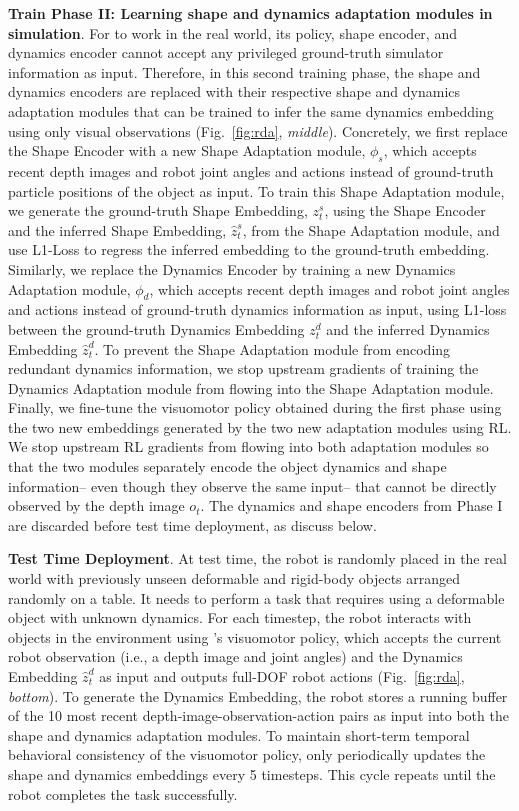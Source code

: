 \textbf{Train Phase II: Learning shape and dynamics adaptation modules in simulation}.
For \methodname{} to work in the real world, its policy, shape encoder, and dynamics encoder cannot accept any privileged ground-truth simulator information as input. Therefore, in this second training phase, the shape and dynamics encoders are replaced with their respective shape and dynamics adaptation modules that can be trained to infer the same dynamics embedding using only visual observations (Fig.~\ref{fig:rda}, \textit{middle}). Concretely, we first replace the Shape Encoder with a new Shape Adaptation module, $\phi_{s}$, which accepts recent depth images and robot joint angles and actions instead of ground-truth particle positions of the object as input. To train this Shape Adaptation module, we generate the ground-truth Shape Embedding, $z_t^{s}$, using the Shape Encoder and the inferred Shape Embedding, $\hat{z}_t^{s}$, from the Shape Adaptation module, and use L1-Loss to regress the inferred embedding to the ground-truth embedding. 
Similarly, we replace the Dynamics Encoder by training a new Dynamics Adaptation module, $\phi_{d}$, which accepts recent depth images and robot joint angles and actions instead of ground-truth dynamics information as input, using L1-loss between the ground-truth Dynamics Embedding $z_t^{d}$ and the inferred Dynamics Embedding $\hat{z}_t^{d}$. To prevent the Shape Adaptation module from encoding redundant dynamics information, we stop upstream gradients of training the Dynamics Adaptation module from flowing into the Shape Adaptation module. Finally, we fine-tune the visuomotor policy obtained during the first phase using the two new embeddings generated by the two new adaptation modules using RL. We stop upstream RL gradients from flowing into both adaptation modules so that the two modules separately encode the object dynamics and shape information-- even though they observe the same input-- that cannot be directly observed by the depth image $o_t$. The dynamics and shape encoders from Phase I are discarded before test time deployment, as discuss below.

\textbf{Test Time Deployment}. At test time, the robot is randomly placed in the real world with previously unseen deformable and rigid-body objects arranged randomly on a table. It needs to perform a task that requires using a deformable object with unknown dynamics. For each timestep, the robot interacts with objects in the environment using \methodname{}'s visuomotor policy, which accepts the current robot observation (i.e., a depth image and joint angles) and the Dynamics Embedding $\hat{z}_t^{d}$ as input and outputs full-DOF robot actions (Fig.~\ref{fig:rda}, \textit{bottom}). To generate the Dynamics Embedding, the robot stores a running buffer of the 10 most recent depth-image-observation-action pairs as input into both the shape and dynamics adaptation modules. To maintain short-term temporal behavioral consistency of the visuomotor policy, \methodname{} only periodically updates the shape and dynamics embeddings every 5 timesteps. This cycle repeats until the robot completes the task successfully. 


